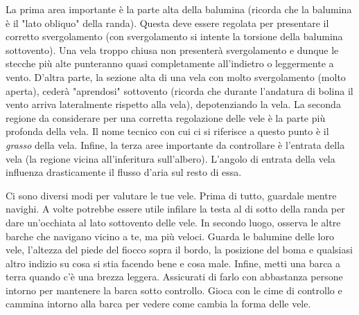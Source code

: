 La prima area importante è la parte alta della balumina (ricorda che la balumina
è il "lato obliquo" della randa). Questa deve essere
regolata per presentare il corretto svergolamento (con svergolamento si intente
la torsione della balumina sottovento). Una vela
troppo chiusa non presenterà svergolamento e dunque le stecche più alte punteranno quasi
completamente all'indietro o leggermente a vento. D'altra parte, la sezione alta di una vela con
molto svergolamento (molto aperta), cederà "aprendosi" sottovento (ricorda che
durante l'andatura di bolina il vento arriva lateralmente rispetto alla vela),
depotenziando la vela.
%
La seconda regione da considerare per una corretta regolazione delle vele è la
parte più profonda della vela. Il nome tecnico con cui ci si riferisce a questo
punto è il \emph{grasso} della vela.
%
Infine, la terza aree importante da controllare è l'entrata della vela (la
regione vicina all'inferitura sull'albero). L'angolo di entrata della vela
influenza drasticamente il flusso d'aria sul resto di essa.

Ci sono diversi modi per valutare le tue vele. Prima di tutto, guardale
mentre navighi. A volte potrebbe essere utile infilare la testa al di sotto della randa
per dare un'occhiata al lato sottovento delle vele. In secondo luogo, osserva le
altre barche che navigano vicino a te, ma più veloci. Guarda le balumine delle
loro vele, l'altezza del piede del fiocco sopra il bordo, la posizione del boma
e qualsiasi altro indizio su cosa si stia facendo bene e cosa male. Infine,
metti una barca a terra quando c'è una brezza leggera. Assicurati di farlo con
abbastanza persone intorno per mantenere la barca sotto controllo. Gioca con le
cime di controllo e cammina intorno alla barca per vedere come cambia la forma
delle vele.

